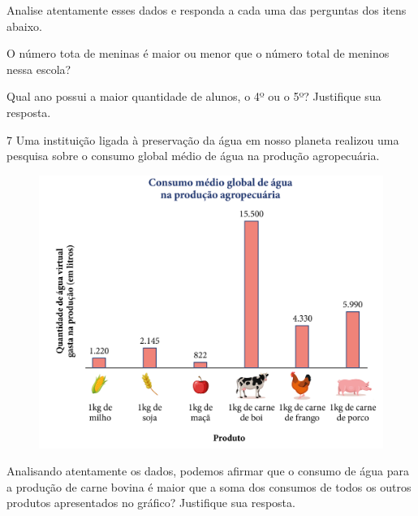 Analise atentamente esses dados e responda a cada uma das perguntas dos
itens abaixo.

\begin{escolha}
\item
  O número tota de meninas é maior ou menor que o número total de
  meninos nessa escola?\\

\item
  Qual ano possui a maior quantidade de alunos, o 4º ou o 5º? Justifique
  sua resposta.\\
\end{escolha}

\pagebreak

\num{7} Uma instituição ligada à preservação da água em nosso planeta
realizou uma pesquisa sobre o consumo global médio de água na produção
agropecuária.

\begin{figure}[htpb!]
\includegraphics[width=\textwidth]{../ilustracoes/MAT5/SAEB_5ANO_MAT_figura106.png}
\end{figure}

Analisando atentamente os dados, podemos afirmar que o consumo de água
para a produção de carne bovina é maior que a soma dos consumos de todos
os outros produtos apresentados no gráfico? Justifique sua resposta.

